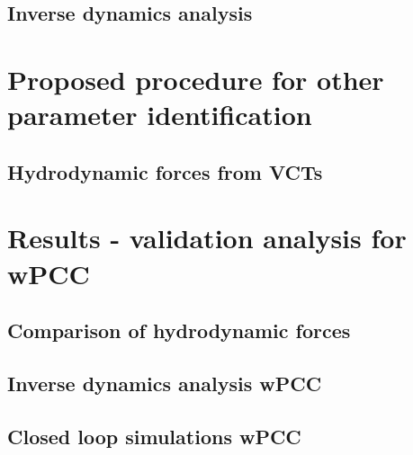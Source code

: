 \documentclass[preprint,11pt,authoryear]{elsarticle}
\begin{document}
\subsection{Inverse dynamics analysis}


\section{Proposed procedure for other parameter identification} \label{sec:PIT}

%

\subsection{Hydrodynamic forces from VCTs}
\label{sec:methodology_VCT}

\FloatBarrier
% 


\section{Results - validation analysis for wPCC}
\label{sec:results_wpcc}

\FloatBarrier
\subsection{Comparison of hydrodynamic forces}

\FloatBarrier

\subsection{Inverse dynamics analysis wPCC} \label{sec:result_ID_wPCC}

\FloatBarrier
\subsection{Closed loop simulations wPCC}

\FloatBarrier



\end{document}
